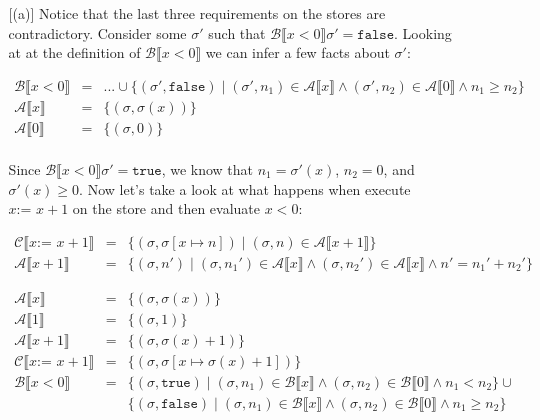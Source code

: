 \documentclass[10pt, oneside]{article}
\begin{document}
\begin{enumerate}[1.]
\begin{enumerate} [(a)]
			Notice that the last three requirements on the stores are contradictory. 
			Consider some $\sigma'$ such that $\mathcal{B} \llbracket x < 0 \rrbracket 
			\sigma' = \texttt{false}$.  Looking at at the definition of 
			$\mathcal{B} \llbracket x < 0 \rrbracket$ we can infer a few facts about 
			$\sigma'$:
			
			\begin{eqnarray*}
			  \mathcal{B} \llbracket x < 0 \rrbracket & = & ... \cup \{ (\sigma', \texttt{false}) \mid (\sigma', n_1) \in \mathcal{A} \llbracket x \rrbracket \wedge (\sigma', n_2) \in \mathcal{A} \llbracket 0 \rrbracket \wedge n_1 \geq n_2 \} \\
			  \mathcal{A} \llbracket x \rrbracket & = & \{(\sigma, \sigma(x))\} \\
			  \mathcal{A} \llbracket 0 \rrbracket & = & \{(\sigma, 0)\} \\
			\end{eqnarray*}
			
			Since $\mathcal{B} \llbracket x < 0 \rrbracket \sigma' = \texttt{true}$, we
			know that $n_1 = \sigma'(x)$, $n_2 = 0$, and $\sigma'(x) \geq 0$. Now let's 
			take a look at what happens when execute $x \texttt{:= } x + 1$ on the 
			store and then evaluate $x < 0$:
			
			\begin{eqnarray*}
			  \mathcal{C} \llbracket x \texttt{:= } x + 1 \rrbracket & = & \{ (\sigma, \sigma[x \mapsto n]) \mid (\sigma, n) \in \mathcal{A} \llbracket x + 1 \rrbracket \} \\
			  \mathcal{A} \llbracket x + 1 \rrbracket & = & \{(\sigma, n') \mid (\sigma, n_1') \in \mathcal{A} \llbracket x \rrbracket \wedge (\sigma, n_2') \in \mathcal{A} \llbracket x \rrbracket \wedge n' = n_1' + n_2' \}
			\end{eqnarray*}
			
			\begin{eqnarray*}
			  \mathcal{A} \llbracket x \rrbracket & = & \{(\sigma, \sigma(x))\} \\
			  \mathcal{A} \llbracket 1 \rrbracket & = & \{(\sigma, 1)\} \\
			  \mathcal{A} \llbracket x + 1 \rrbracket & = & \{(\sigma, \sigma(x) + 1)\} \\
			  \mathcal{C} \llbracket x \texttt{:= } x + 1 \rrbracket & = & \{(\sigma, \sigma[x \mapsto \sigma(x) + 1])\} \\
			  \mathcal{B} \llbracket x < 0 \rrbracket & = & \{(\sigma, \texttt{true}) \mid (\sigma, n_1) \in \mathcal{B} \llbracket x \rrbracket \wedge (\sigma, n_2) \in \mathcal{B} \llbracket 0 \rrbracket \wedge n_1 < n_2\} \cup \\
			  & & \{(\sigma, \texttt{false}) \mid (\sigma,n_1) \in \mathcal{B} \llbracket x \rrbracket \wedge (\sigma, n_2) \in \mathcal{B} \llbracket 0 \rrbracket \wedge n_1 \geq n_2 \}
			\end{eqnarray*}
			

\end{enumerate}
\end{enumerate}
\end{document}
